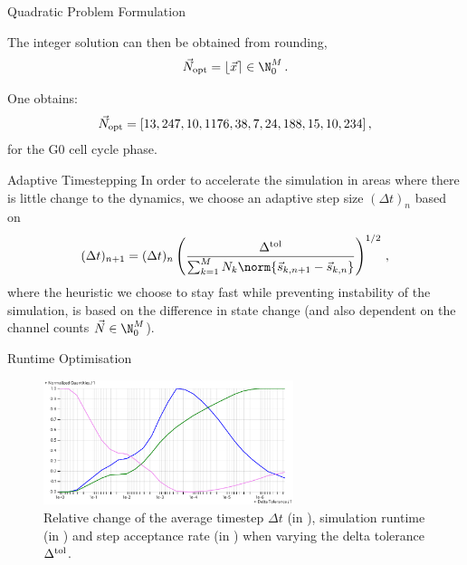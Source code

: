 \documentclass[aspectratio=169, hyperref={colorlinks=true}]{beamer}
\begin{document}
\begin{frame}[allowframebreaks]{Quadratic Problem Formulation}

    The integer solution can then be obtained from rounding,
    $$\vec{N}_{\rm opt} = \lfloor \vec{x} \rceil \in \N_0^M\,.$$

    One obtains:
    $$\vec{N}_{\rm opt} = [13, 247, 10, 1176, 38, 7, 24, 188, 15, 10, 234]\,,$$
    for the G0 cell cycle phase.
  \end{frame}

  \begin{frame}{Adaptive Timestepping}
    In order to accelerate the simulation in areas where there is little change to the dynamics, we choose an adaptive step size $(\Delta t)_{n}$ based on
    \begin{equation*}
      (\Delta t)_{n+1} = (\Delta t)_{n} \left(\frac{\Delta^{\rm tol}}{\sum_{k=1}^{M} N_k \norm{\vec{s}_{k,n+1} - \vec{s}_{k,n}}}\right)^{1/2}\,,
      \label{eq:dt-heuristic}
    \end{equation*}
    where the heuristic we choose to stay fast while preventing instability of the simulation, is based on the difference in state change (and also dependent on the channel counts $\vec{N} \in \N_0^M$).
  \end{frame}

  \begin{frame}{Runtime Optimisation}
    \begin{figure}
      \includegraphics[width=0.65\textwidth]{../../figures/results/delta-tolerance.pdf}
      \caption{
        Relative change of the average timestep $\Delta t$ (in ), simulation runtime (in ) and step acceptance rate (in ) when varying the delta tolerance $\Delta^{\rm tol}$.
      }
    \end{figure}
  \end{frame}
\end{document}
